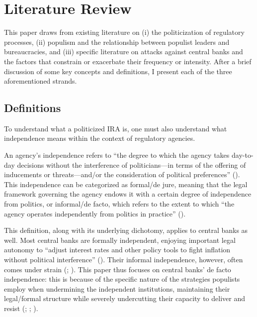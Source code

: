 \documentclass[
  11pt,
  letterpaper,
  DIV=11,
  numbers=noendperiod]{scrartcl}
\begin{document}
\section{\texorpdfstring{\textbf{Literature
Review}}{Literature Review}}\label{literature-review}

This paper draws from existing literature on (i) the politicization of
regulatory processes, (ii) populism and the relationship between
populist leaders and bureaucracies, and (iii) specific literature on
attacks against central banks and the factors that constrain or
exacerbate their frequency or intensity. After a brief discussion of
some key concepts and definitions, I present each of the three
aforementioned strands.

\subsection{Definitions}\label{definitions}

To understand what a politicized IRA is, one must also understand what
independence means within the context of regulatory agencies.

An agency's independence refers to ``the degree to which the agency
takes day-to-day decisions without the interference of politicians---in
terms of the offering of inducements or threats---and/or the
consideration of political preferences''
(). This
independence can be categorized as formal/de jure, meaning that the
legal framework governing the agency endows it with a certain degree of
independence from politics, or informal/de facto, which refers to the
extent to which ``the agency operates independently from politics in
practice'' ().

This definition, along with its underlying dichotomy, applies to central
banks as well. Most central banks are formally independent, enjoying
important legal autonomy to ``adjust interest rates and other policy
tools to fight inflation without political interference''
(). Their informal
independence, however, often comes under strain
(;
). This paper thus focuses on central
banks' de facto independence: this is because of the specific nature of
the strategies populists employ when undermining the independent
institutions, maintaining their legal/formal structure while severely
undercutting their capacity to deliver and resist
(;
;
).
\end{document}
